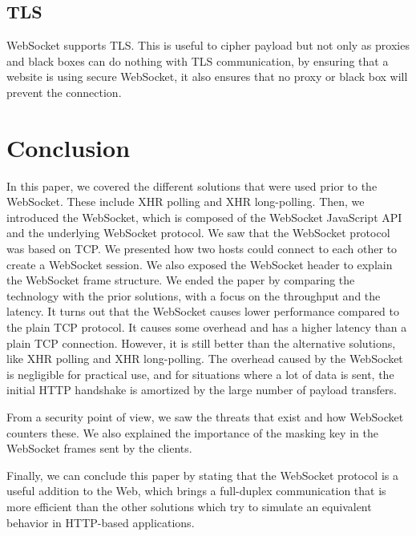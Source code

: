 \documentclass[10pt,journal,compsoc]{IEEEtran}
\newcommand{\ws}{WebSocket}
\begin{document}
\subsection{TLS}
\ws{} supports TLS.
This is useful to cipher payload but not only as proxies and black boxes can do nothing with TLS communication, by ensuring that a website is using secure \ws{}, it also ensures that no proxy or black box will prevent the connection.


\section{Conclusion}
In this paper, we covered the different solutions that were used prior to the \ws{}.
These include XHR polling and XHR long-polling.
Then, we introduced the \ws{}, which is composed of the \ws{} JavaScript API and the underlying \ws{} protocol. %
We saw that the \ws{} protocol was based on TCP.
We presented how two hosts could connect to each other to create a \ws{} session.
We also exposed the \ws{} header to explain the \ws{} frame structure. %
We ended the paper by comparing the technology with the prior solutions, with a focus on the throughput and the latency.
It turns out that the \ws{} causes lower performance compared to the plain TCP protocol.
It causes some overhead and has a higher latency than a plain TCP connection.
However, it is still better than the alternative solutions, like XHR polling and XHR long-polling. %
The overhead caused by the \ws{} is negligible for practical use, and for situations where a lot of data is sent, the initial HTTP handshake is amortized by the large number of payload transfers. %

From a security point of view, we saw the threats that exist and how \ws{} counters these.
We also explained the importance of the masking key in the \ws{} frames sent by the clients. %

Finally, we can conclude this paper by stating that the \ws{} protocol is a useful addition to the Web, which brings a full-duplex communication that is more efficient than the other solutions which try to simulate an equivalent behavior in HTTP-based applications.

\ifCLASSOPTIONcaptionsoff
  \newpage
\fi




\end{document}
